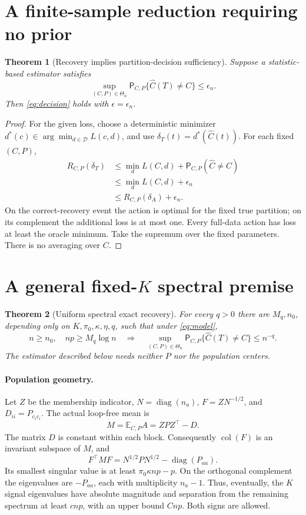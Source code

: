 \documentclass[11pt]{article}
\newtheorem{theorem}{Theorem}
\newcommand{\PP}{\mathsf P}
\newcommand{\EE}{\mathbb E}
\begin{document}
\section{A finite-sample reduction requiring no prior}
\begin{theorem}[Recovery implies partition-decision sufficiency]\label{thm:reduction}
Suppose a statistic-based estimator satisfies
\[
 \sup_{(C,P)\in\Theta_n}
 \PP_{C,P}\{\widehat C(T)\ne C\}\le\epsilon_n.
\]
Then \eqref{eq:decision} holds with $\epsilon=\epsilon_n$.
\end{theorem}
\begin{proof}
For the given loss, choose a deterministic minimizer
$d^*(c)\in\arg\min_{d\in\mathcal D}L(c,d)$, and use
$\delta_T(t)=d^*(\widehat C(t))$. For each fixed $(C,P)$,
\begin{align*}
 R_{C,P}(\delta_T)
 &\le \min_d L(C,d)+\PP_{C,P}(\widehat C\ne C)\\
 &\le \min_d L(C,d)+\epsilon_n\\
 &\le R_{C,P}(\delta_A)+\epsilon_n.
\end{align*}
On the correct-recovery event the action is optimal for the fixed true
partition; on its complement the additional loss is at most one.
Every full-data action has loss at least the oracle minimum. Take the
supremum over the fixed parameters. There is no averaging over $C$.
\end{proof}

\section{A general fixed-\texorpdfstring{$K$}{K} spectral premise}
\begin{theorem}[Uniform spectral exact recovery]\label{thm:recovery}
For every $q>0$ there are $M_q,n_0$, depending only on
$K,\pi_0,\kappa,\eta,q$, such that under \eqref{eq:model},
\[
 n\ge n_0,\quad np\ge M_q\log n
 \quad\Longrightarrow\quad
 \sup_{(C,P)\in\Theta_n}
 \PP_{C,P}\{\widehat C(T)\ne C\}\le n^{-q}.
\]
The estimator described below needs neither $P$ nor the population centers.
\end{theorem}

\paragraph{Population geometry.}
Let $Z$ be the membership indicator, $N=\operatorname{diag}(n_a)$,
$F=ZN^{-1/2}$, and $D_{ii}=P_{c_i c_i}$. The actual loop-free mean is
\[
 M=\EE_{C,P}A=ZPZ^\top-D.
\]
The matrix $D$ is constant within each block. Consequently
$\operatorname{col}(F)$ is an invariant subspace of $M$, and
\[
 F^\top MF=N^{1/2}PN^{1/2}-\operatorname{diag}(P_{aa}).
\]
Its smallest singular value is at least $\pi_0\kappa np-p$.
On the orthogonal complement the eigenvalues are $-P_{aa}$, each with
multiplicity $n_a-1$. Thus, eventually, the $K$ signal eigenvalues have
absolute magnitude and separation from the remaining spectrum at least
$c np$, with an upper bound $Cnp$. Both signs are allowed.
\end{document}
